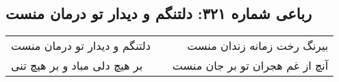\begin{center}
\section*{رباعی شماره ۳۲۱: دلتنگم و دیدار تو درمان منست}
\label{sec:0321}
\begin{longtable}{l p{0.5cm} r}
دلتنگم و دیدار تو درمان منست
&&
بیرنگ رخت زمانه زندان منست
\\
بر هیچ دلی مباد و بر هیچ تنی
&&
آنچ از غم هجران تو بر جان منست
\\
\end{longtable}
\end{center}
